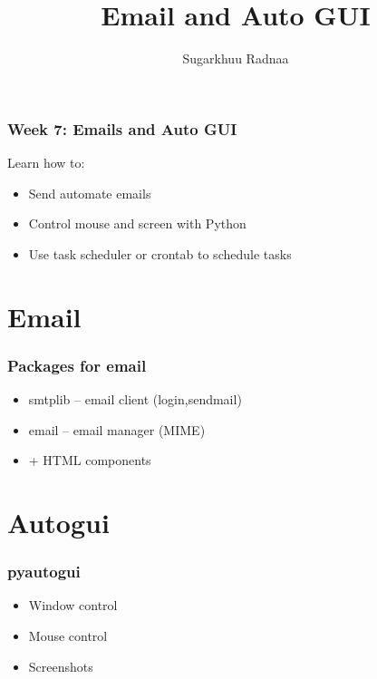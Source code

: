 \documentclass{beamer}
\title[Introduction to Python]{Email and Auto GUI}
\author{Sugarkhuu Radnaa}
\institute[]
{
Py4Econ in Ulaanbaatar \\ 
\medskip
\textit{py4econ@gmail.com} 
}
\date{}  %
\begin{document}
\begin{frame}
\titlepage %
\end{frame}

\begin{frame}
    \frametitle{Week 7: Emails and Auto GUI}
    Learn how to:
    \begin{itemize}
        \item Send automate emails
        \item Control mouse and screen with Python
        \item Use task scheduler or crontab to schedule tasks
    \end{itemize}
\end{frame}

\section{Email} 

\begin{frame}
    \frametitle{Packages for email}
            \begin{itemize}
                \item smtplib – email client (login,sendmail)
                \item email – email manager (MIME)
                \item + HTML components
            \end{itemize}
\end{frame}

\section{Autogui} 

\begin{frame}
    \frametitle{pyautogui}
            \begin{itemize}
                \item Window control
                \item Mouse control
                \item Screenshots
            \end{itemize}
\end{frame}

\end{document}
